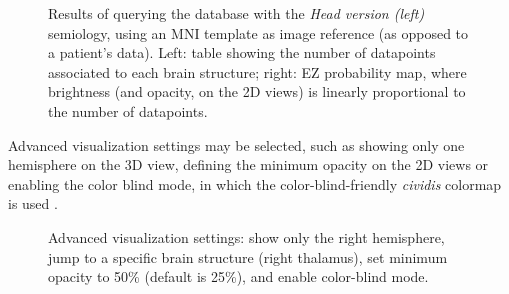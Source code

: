 \begin{figure}
  \centering
  \caption[Results of querying the database with the \textit{Head version (left)} semiology]{
    Results of querying the database with the \textit{Head version (left)} semiology, using an \ac{MNI} template as image reference (as opposed to a patient's data).
    Left: table showing the number of datapoints associated to each brain structure;
    right: \ac{EZ} probability map, where brightness (and opacity, on the 2D views) is linearly proportional to the number of datapoints.
  }
  \label{fig:svt_query}
\end{figure}


Advanced visualization settings may be selected, such as
showing only one hemisphere on the 3D view,
defining the minimum opacity on the 2D views or
enabling the color blind mode, in which the color-blind-friendly \textit{cividis} colormap is used \cite{nunez_optimizing_2018}.

\begin{figure}
  \centering
  \caption[Advanced visualization settings]{
    Advanced visualization settings:
    show only the right hemisphere,
    jump to a specific brain structure (right thalamus),
    set minimum opacity to 50\% (default is 25\%),
    and enable color-blind mode.
  }
  \label{fig:svt_advanced}
\end{figure}

